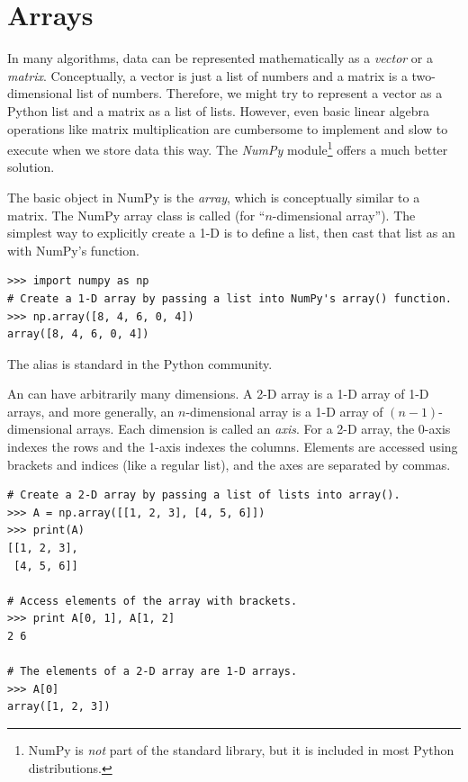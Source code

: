 \section*{Arrays} %

In many algorithms, data can be represented mathematically as a \emph{vector} or a \emph{matrix}.
Conceptually, a vector is just a list of numbers and a matrix is a two-dimensional list of numbers.
Therefore, we might try to represent a vector as a Python list and a matrix as a list of lists.
However, even basic linear algebra operations like matrix multiplication are cumbersome to implement and slow to execute when we store data this way.
The \emph{NumPy} module\footnote{NumPy is \emph{not} part of the standard library, but it is included in most Python distributions.} offers a much better solution.

The basic object in NumPy is the \emph{array}, which is conceptually similar to a matrix.
The NumPy array class is called  (for ``$n$-dimensional array'').
The simplest way to explicitly create a 1-D  is to define a list, then cast that list as an  with NumPy's  function.

\begin{lstlisting}
>>> import numpy as np
# Create a 1-D array by passing a list into NumPy's array() function.
>>> np.array([8, 4, 6, 0, 4])
array([8, 4, 6, 0, 4])
\end{lstlisting}
The alias  is standard in the Python community.

An  can have arbitrarily many dimensions.
A 2-D array is a 1-D array of 1-D arrays, and more generally, an $n$-dimensional array is a 1-D array of $(n-1)$-dimensional arrays.
Each dimension is called an \emph{axis}.
For a 2-D array, the 0-axis indexes the rows and the 1-axis indexes the columns.
Elements are accessed using brackets and indices (like a regular list), and the axes are separated by commas.

\begin{lstlisting}
# Create a 2-D array by passing a list of lists into array().
>>> A = np.array([[1, 2, 3], [4, 5, 6]])
>>> print(A)
[[1, 2, 3],
 [4, 5, 6]]

# Access elements of the array with brackets.
>>> print A[0, 1], A[1, 2]
2 6

# The elements of a 2-D array are 1-D arrays.
>>> A[0]
array([1, 2, 3])
\end{lstlisting}


